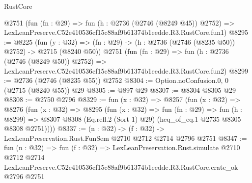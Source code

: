 \begin{lexlean}{RustCore}
\begin{coremodule}
    @2751
    (fun (fn : @29) =>
    fun (h : @2736 (@2746 (@8249 @45)) @2752) =>
    LexLeanPreserve.C52e410536cf15c88af9b61374b1eedde.R3.RustCore.fun1)
@8295 := @8225
    (fun (y : @32) => (fn : @29) -> (h : @2736 (@2746 (@8235 @50)) @2752) -> @2715 (@8240 @50))
    @2751
    (fun (fn : @29) =>
    fun (h : @2736 (@2746 (@8249 @50)) @2752) =>
    LexLeanPreserve.C52e410536cf15c88af9b61374b1eedde.R3.RustCore.fun2)
@8299 := @2736 (@2746 (@8235 @55)) @2752
@8304 := Option.noConfusion.{0, 0} (@2715 (@8240 @55)) @29
@8305 := @897 @29
@8307 := @8304 @8305 @29
@8308 := @2750 @2796
@8329 := fun (x : @32) =>
  @8257
    (fun (x : @32) =>
    @8276
      (fun (x : @32) =>
      @8295
        (fun (x : @32) =>
        fun (fn : @29) =>
        fun (h : @8299) =>
        @8307 @8308 (Eq.refl.{2} (Sort 1) @29) (heq_of_eq.{1} @2735 @8305 @8308 @2751))))
@8337 := (n : @32) -> (f : @32) -> LexLeanPreservation.Rust.FunSem @2710 @2712 @2714 @2796 @2751
@8347 := fun (n : @32) =>
  fun (f : @32) =>
  LexLeanPreservation.Rust.simulate
    @2710
    @2712
    @2714
    LexLeanPreserve.C52e410536cf15c88af9b61374b1eedde.R3.RustCore.crate_ok
    @2796
    @2751
\end{coremodule}
\end{lexlean}

